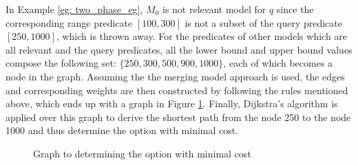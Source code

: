 \begin{example}
In Example \ref{eg: two_phase_eg}, $M_0$ is not relevant model for $q$ since the corresponding range predicate $[100, 300]$ is not a subset of the query predicate $[250, 1000]$, which is thrown away. For the predicates of other models which are all relevant and the query predicates, all the lower bound and upper bound values compose the following set: $\{250, 300, 500, 900, 1000\}$, each of which becomes a node in the graph. Assuming the the merging model approach is used, the edges and corresponding weights are then constructed by following the rules mentioned above, which ends up with a graph in Figure \ref{fig:min_cost_graph}. Finally, Dijkstra's algorithm is applied over this graph to derive the shortest path from the node 250 to the node 1000 and thus determine the option with minimal cost.

\begin{figure}[t]
\begin{center}
\end{center}
\caption{Graph to determining the option with minimal cost}
\label{fig:min_cost_graph}
\end{figure}

\end{example}

